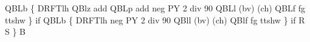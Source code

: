 \documentclass[11pt]{article}
\begin{document}
      QBLb \{      %
        DRFTlh    %
        QBlz add  %
        QBLp add  %
        neg       %
        PY 2 div  %
        90        %
        QBLl      %
        (bv) (ch) %
        QBLf      %
        fg        %
        ttshw     %
      \} if        %
      QBLb \{      %
        DRFTlh    %
        neg       %
        PY 2 div  %
        90        %
        QBll      %
        (bv) (ch) %
        QBlf      %
        fg        %
        ttshw     %
      \} if        %
    R             %
    S          %
\} B            %
\eatline
\end{document}
